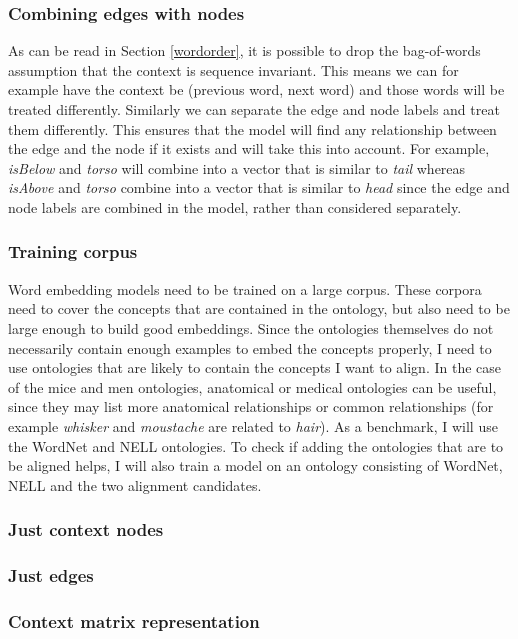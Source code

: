 \documentclass{article}
\begin{document}
  \subsubsection{Combining edges with nodes}
  As can be read in Section \ref{wordorder}, it is possible to drop the bag-of-words assumption that the context is sequence invariant.
  This means we can for example have the context be (previous word, next word) and those words will be treated differently. Similarly we can separate the edge and node labels and treat them differently. This ensures that the model will find any relationship between the edge and the node if it exists and will take this into account. For example, \emph{isBelow} and \emph{torso} will combine into a vector that is similar to \emph{tail} whereas \emph{isAbove} and \emph{torso} combine into a vector that is similar to \emph{head} since the edge and node labels are combined in the model, rather than considered separately.
 
 \subsubsection{Training corpus}
  Word embedding models need to be trained on a large corpus. These corpora need to cover the concepts that are contained in the ontology, but also need to be large enough to build good embeddings. Since the ontologies themselves do not necessarily contain enough examples to embed the concepts properly, I need to use ontologies that are likely to contain the concepts I want to align. In the case of the mice and men ontologies, anatomical or medical ontologies can be useful, since they may list more anatomical relationships or common relationships (for example \emph{whisker} and \emph{moustache} are related to \emph{hair}).
  As a benchmark, I will use the WordNet and NELL ontologies. To check if adding the ontologies that are to be aligned helps, I will also train a model on an ontology consisting of WordNet, NELL and the two alignment candidates. 
  
  \subsubsection{Just context nodes}
  
  \subsubsection{Just edges}
  
  \subsubsection{Context matrix representation}
 
\end{document}
